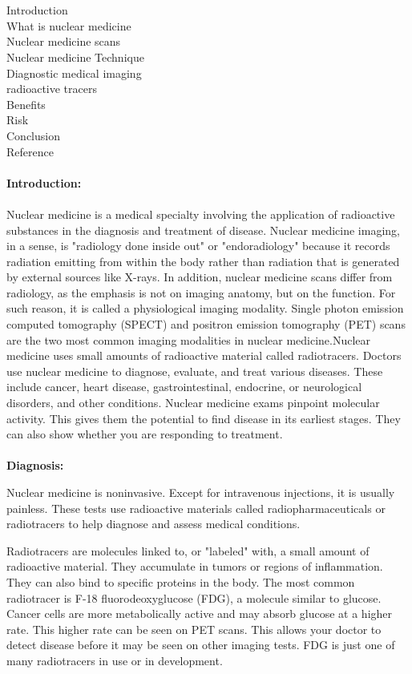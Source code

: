 \documentclass[12pt]{article}
\begin{document}
\\ \\Introduction \\ What is nuclear medicine \\ Nuclear medicine scans \\ Nuclear medicine Technique \\Diagnostic medical imaging \\ radioactive tracers \\  Benefits \\ Risk \\ Conclusion \\ Reference \\ \\ \textbf{\large Introduction:} \\ \\ Nuclear medicine is a medical specialty involving the application of radioactive substances in the diagnosis and treatment of disease. Nuclear medicine imaging, in a sense, is "radiology done inside out" or "endoradiology" because it records radiation emitting from within the body rather than radiation that is generated by external sources like X-rays. In addition, nuclear medicine scans differ from radiology, as the emphasis is not on imaging anatomy, but on the function. For such reason, it is called a physiological imaging modality. Single photon emission computed tomography (SPECT) and positron emission tomography (PET) scans are the two most common imaging modalities in nuclear medicine.Nuclear medicine uses small amounts of radioactive material called radiotracers. Doctors use nuclear medicine to diagnose, evaluate, and treat various diseases. These include cancer, heart disease, gastrointestinal, endocrine, or neurological disorders, and other conditions. Nuclear medicine exams pinpoint molecular activity. This gives them the potential to find disease in its earliest stages. They can also show whether you are responding to treatment.
\\ \noindent
\\ \textbf{\large Diagnosis:}

\noindent Nuclear medicine is noninvasive. Except for intravenous injections, it is usually painless. These tests use radioactive materials called radiopharmaceuticals or radiotracers to help diagnose and assess medical conditions.

\noindent Radiotracers are molecules linked to, or "labeled" with, a small amount of radioactive material. They accumulate in tumors or regions of inflammation. They can also bind to specific proteins in the body. The most common radiotracer is F-18 fluorodeoxyglucose (FDG), a molecule similar to glucose. Cancer cells are more metabolically active and may absorb glucose at a higher rate. This higher rate can be seen on PET scans. This allows your doctor to detect disease before it may be seen on other imaging tests. FDG is just one of many radiotracers in use or in development.
\end{document}
